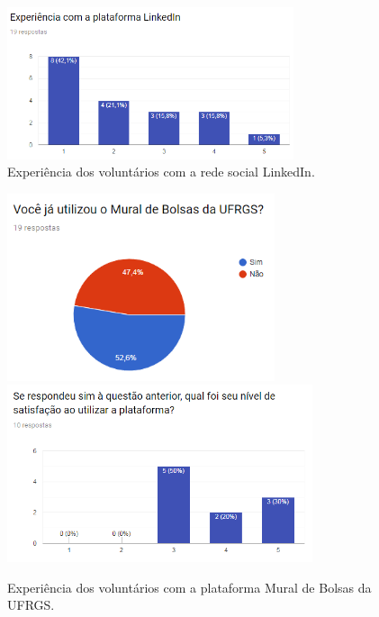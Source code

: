 \begin{figure}[H]
    \caption{Experiência dos voluntários com a rede social LinkedIn.}
       	\begin{center}
            \includegraphics[width=0.75\textwidth]{figuras/avaliacao/xp-linkedin.png}
        \end{center}
    \label{avalGrafLinkedin}
\end{figure}

\begin{figure}[H]
    \caption{Experiência dos voluntários com a plataforma Mural de Bolsas da UFRGS.}
       	\begin{center}
            \includegraphics[width=0.7\textwidth]{figuras/avaliacao/mural-bolsas.png}
            \\
            \includegraphics[width=0.8\textwidth]{figuras/avaliacao/mural-bolsas-2.png}
        \end{center}
    \label{avalGrafMB}
\end{figure}

